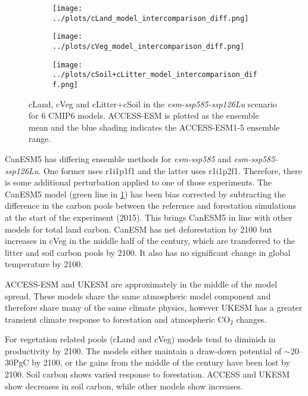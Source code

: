 \documentclass[]{article}
\begin{document}
\begin{figure}[H]
    \centering
    \begin{subfigure}[b]{0.45\linewidth}
        \texttt{[image: ../plots/cLand\_model\_intercomparison\_diff.png]}
    \end{subfigure}
    \begin{subfigure}[b]{0.45\linewidth}
        \texttt{[image: ../plots/cVeg\_model\_intercomparison\_diff.png]}
    \end{subfigure}
    \begin{subfigure}[b]{0.45\linewidth}
        \texttt{[image: ../plots/cSoil+cLitter\_model\_intercomparison\_diff.png]}
    \end{subfigure}
    \caption{cLand, cVeg and cLitter+cSoil in the \textit{esm-ssp585-ssp126Lu} scenario for 6 CMIP6 models. ACCESS-ESM is plotted as the ensemble mean and the blue shading indicates the ACCESS-ESM1-5 ensemble range.}
    \label{fig:models_cpools}
\end{figure}

CanESM5 has differing ensemble methods for \textit{esm-ssp585} and \textit{esm-ssp585-ssp126Lu}.
One former uses r1i1p1f1 and the latter uses r1i1p2f1.
Therefore, there is some additional perturbation applied to one of those experiments.
The CanESM5 model (green line in \ref{fig:models_cpools}) has been bias corrected by subtracting the difference in the carbon pools between the reference and forestation simulations at the start of the experiment (2015).
This brings CanESM5 in line with other models for total land carbon.
CanESM has net deforestation by 2100 but increases in cVeg in the middle half of the century, which are transferred to the litter and soil carbon pools by 2100.
It also has no significant change in global temperature by 2100.

ACCESS-ESM and UKESM are approximately in the middle of the model spread.
These models share the same atmospheric model component and therefore share many of the same climate physics, however UKESM has a greater transient climate response to forestation and atmospheric CO$_2$ changes.

For vegetation related pools (cLand and cVeg) models tend to diminish in productivity by 2100.
The models  either maintain a draw-down potential of $\sim$20--30PgC by 2100, or the gains from the middle of the century have been lost by 2100.
Soil carbon shows varied response to forestation.
ACCESS and UKESM show decreases in soil carbon, while other models show increases.
\end{document}

